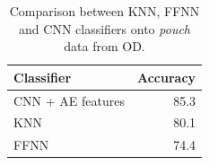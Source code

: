 \begin{table}[h]
  \begin{center}
    \begin{tabular}{lr}
      \hline
      Classifier & Accuracy \\
      \hline
      CNN + AE features & 85.3 \\
      KNN & 80.1 \\
      FFNN & 74.4 \\
      \hline
    \end{tabular}
    \caption{Comparison between KNN, FFNN and CNN classifiers onto \textit{pouch} data from OD.}
    \label{tab:classifiers-comparison}
  \end{center}
\end{table}
